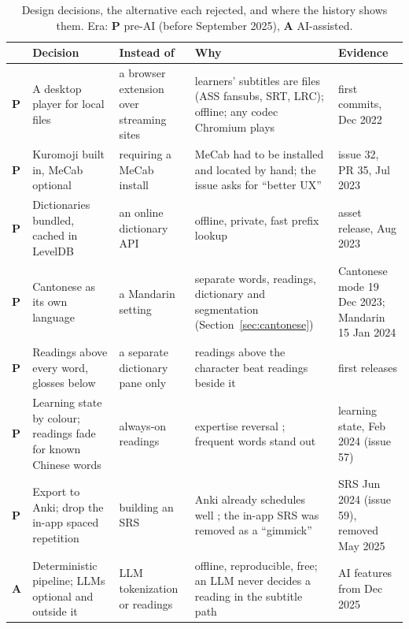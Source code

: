 ﻿\documentclass[11pt,a4paper]{article}
\begin{document}
\begin{table}[p]
\centering
\small
\caption{Design decisions, the alternative each rejected, and where the history shows them. Era: \textcolor{preai}{\textbf{P}} pre-AI (before September 2025), \textcolor{withai}{\textbf{A}} AI-assisted.}
\label{tab:decisions}
\renewcommand{\arraystretch}{1.18}
\begin{tabularx}{\linewidth}{@{}p{0.3cm}P{3.1cm}P{2.6cm}YP{2.2cm}@{}}
\toprule
 & Decision & Instead of & Why & Evidence \\
\midrule
\textcolor{preai}{\textbf{P}} & A desktop player for local files & a browser extension over streaming sites & learners' subtitles are files (ASS fansubs, SRT, LRC); offline; any codec Chromium plays & first commits, Dec 2022 \\
\textcolor{preai}{\textbf{P}} & Kuromoji built in, MeCab optional & requiring a MeCab install & MeCab had to be installed and located by hand; the issue asks for ``better UX'' & issue 32, PR 35, Jul 2023 \\
\textcolor{preai}{\textbf{P}} & Dictionaries bundled, cached in LevelDB & an online dictionary API & offline, private, fast prefix lookup & asset release, Aug 2023 \\
\textcolor{preai}{\textbf{P}} & Cantonese as its own language & a Mandarin setting & separate words, readings, dictionary and segmentation (Section~\ref{sec:cantonese}) & Cantonese mode 19 Dec 2023; Mandarin 15 Jan 2024 \\
\textcolor{preai}{\textbf{P}} & Readings above every word, glosses below & a separate dictionary pane only & readings above the character beat readings beside it \citep{lee2011effectiveness} & first releases \\
\textcolor{preai}{\textbf{P}} & Learning state by colour; readings fade for known Chinese words & always-on readings & expertise reversal \citep{lee2011onscreen}; frequent words stand out & learning state, Feb 2024 (issue 57) \\
\textcolor{preai}{\textbf{P}} & Export to Anki; drop the in-app spaced repetition & building an SRS & Anki already schedules well \citep{settles2016trainable}; the in-app SRS was removed as a ``gimmick'' & SRS Jun 2024 (issue 59), removed May 2025 \\
\textcolor{withai}{\textbf{A}} & Deterministic pipeline; LLMs optional and outside it & LLM tokenization or readings & offline, reproducible, free; an LLM never decides a reading in the subtitle path & AI features from Dec 2025 \\

\end{tabularx}
\end{table}
\end{document}
